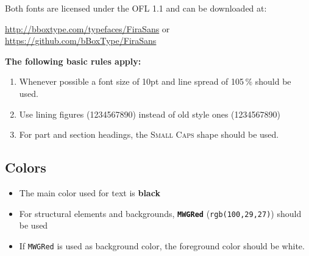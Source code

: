 \documentclass{InformatikMWGArticle}
\begin{document}
    \medskip
    Both fonts are licensed under the OFL 1.1 and can be downloaded at:
    \begin{center}
        \url{http://bboxtype.com/typefaces/FiraSans} or \\
        \url{https://github.com/bBoxType/FiraSans}
    \end{center}
    
    \medskip
    \textbf{The following basic rules apply:} \nopagebreak
    \begin{enumerate}
        \item Whenever possible a font size of 10pt and line spread of 105\,\% should be used.
        \item Use lining figures (1234567890) instead of old style ones {(1234567890)}
        \item For part and section headings, the \textsc{Small Caps} shape should be used.
    \end{enumerate}
    
    
    \subsection{Colors}
    \begin{itemize}\itemsep0pt
        \item The main color used for text is \textbf{black}
        \item For structural elements and backgrounds, \textbf{\color{MWGRed}\texttt{MWGRed}} (\texttt{rgb(100,29,27)}) should be used
        \item If {\color{MWGRed}\texttt{MWGRed}} is used as background color, the foreground color should be white.
    \end{itemize}
    
    
\end{document}
